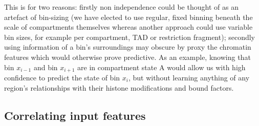 \documentclass[a4paper,11pt,oneside]{book}
\begin{document}
This is for two reasons: firstly non independence could be thought of as an artefact of bin-sizing (we have elected to use regular, fixed binning beneath the scale of compartments themselves whereas another approach could use variable bin sizes, for example per compartment, TAD or restriction fragment); secondly using information of a bin's surroundings may obscure by proxy the chromatin features which would otherwise prove predictive. As an example, knowing that bin $x_{i-1}$ and bin $x_{i+1}$ are in compartment state A would allow us with high confidence to predict the state of bin $x_i$, but without learning anything of any region's relationships with their histone modifications and bound factors.

\subsection{Correlating input features}\label{sec:corrinputs}

\ifstandalone
\begin{small}

\end{small}
\fi
\end{document}
